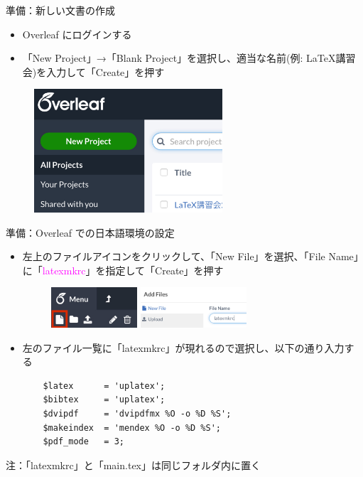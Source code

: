 \documentclass[dvipdfmx]{beamer}
\begin{document}
\begin{frame}[fragile]{準備：新しい文書の作成}
\begin{itemize}
    \item Overleaf にログインする
    \item 「New Project」→「Blank Project」を選択し、適当な名前(例: LaTeX講習会)を入力して「Create」を押す
\end{itemize}
\begin{figure}
    \centering
    \includegraphics[width=7cm,pagebox=cropbox,clip]{NewDocument}
\end{figure}
\end{frame}

\begin{frame}[fragile]{準備：Overleaf での日本語環境の設定}
\begin{itemize}
    \item 左上のファイルアイコンをクリックして、「New File」を選択、「File Name」に「\textcolor{magenta}{latexmkrc}」を指定して「Create」を押す
    \begin{figure}
        \centering
        \includegraphics[height=1.5cm]{fig_new_file.jpg}
        \qquad
        \includegraphics[height=1.5cm]{fig_latexmkrc.pdf}
    \end{figure}
    
    \item 左のファイル一覧に「latexmkrc」が現れるので選択し、以下の通り入力する
    \begin{verbatim}
    $latex      = 'uplatex';
    $bibtex     = 'uplatex';
    $dvipdf     = 'dvipdfmx %O -o %D %S';
    $makeindex  = 'mendex %O -o %D %S';
    $pdf_mode   = 3;
    \end{verbatim}
\end{itemize}
\alert{注}：「latexmkrc」と「main.tex」は同じフォルダ内に置く
\end{frame}
\end{document}
